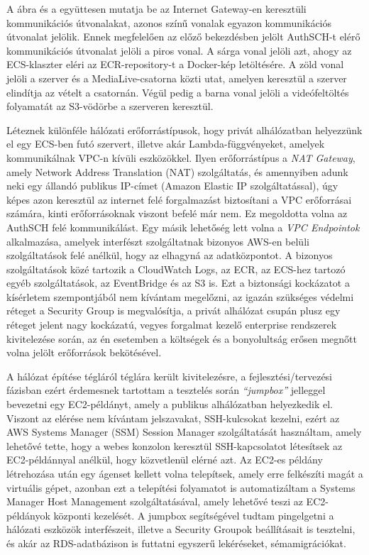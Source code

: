 A  ábra és a  együttesen mutatja be az Internet Gateway-en keresztüli kommunikációs útvonalakat, azonos színű vonalak egyazon kommunikációs útvonalat jelölik. Ennek megfelelően az előző bekezdésben jelölt AuthSCH-t elérő kommunikációs útvonalat jelöli a piros vonal. A sárga vonal jelöli azt, ahogy az ECS-klaszter eléri az ECR-repository-t a Docker-kép letöltésére. A zöld vonal jelöli a szerver és a MediaLive-csatorna közti utat, amelyen keresztül a szerver elindítja az vételt a csatornán. Végül pedig a barna vonal jelöli a videófeltöltés folyamatát az S3-vödörbe a szerveren keresztül.

Léteznek különféle hálózati erőforrástípusok, hogy privát alhálózatban helyezzünk el egy ECS-ben futó szervert, illetve akár Lambda-függvényeket, amelyek kommunikálnak VPC-n kívüli eszközökkel. Ilyen erőforrástípus a \emph{NAT Gateway}, amely Network Address Translation (NAT) szolgáltatás, és amennyiben adunk neki egy állandó publikus IP-címet (Amazon Elastic IP szolgáltatással), úgy képes azon keresztül az internet felé forgalmazást biztosítani a VPC erőforrásai számára, kinti erőforrásoknak viszont befelé már nem. Ez megoldotta volna az AuthSCH felé kommunikálást. Egy másik lehetőség lett volna a \emph{VPC Endpointok} alkalmazása, amelyek interfészt szolgáltatnak bizonyos AWS-en belüli szolgáltatások felé anélkül, hogy az elhagyná az adatközpontot. A bizonyos szolgáltatások közé tartozik a CloudWatch Logs, az ECR, az ECS-hez tartozó egyéb szolgáltatások, az EventBridge és az S3 is. Ezt a biztonsági kockázatot a kísérletem szempontjából nem kívántam megelőzni, az igazán szükséges védelmi réteget a Security Group is megvalósítja, a privát alhálózat csupán plusz egy réteget jelent nagy kockázatú, vegyes forgalmat kezelő enterprise rendszerek kivitelezése során, az én esetemben a költségek és a bonyolultság erősen megnőtt volna jelölt erőforrások bekötésével.

A hálózat építése tégláról téglára került kivitelezésre, a fejlesztési/tervezési fázisban ezért érdemesnek tartottam a tesztelés során \emph{``jumpbox''} jelleggel bevezetni egy EC2-példányt, amely a publikus alhálózatban helyezkedik el. Viszont az elérése nem kívántam jelszavakat, SSH-kulcsokat kezelni, ezért az AWS Systems Manager (SSM) Session Manager szolgáltatását használtam, amely lehetővé tette, hogy a webes konzolon keresztül SSH-kapcsolatot létesítsek az EC2-példánnyal anélkül, hogy közvetlenül elérné azt. Az EC2-es példány létrehozása után egy ágenset kellett volna telepítsek, amely erre felkészíti magát a virtuális gépet, azonban ezt a telepítési folyamatot is automatizáltam a Systems Manager Host Management szolgáltatásával, amely lehetővé teszi az EC2-példányok központi kezelését. A jumpbox segítségével tudtam pingelgetni a hálózati eszközök interfészeit, illetve a Security Groupok beállításait is tesztelni, és akár az RDS-adatbázison is futtatni egyszerű lekéréseket, sémamigrációkat.

